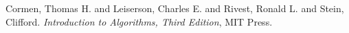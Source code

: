 \begin{thebibliography}{10}

 Cormen, Thomas H. and Leiserson, Charles E. and Rivest, Ronald L. and Stein, Clifford. \textit{Introduction to Algorithms, Third Edition}, MIT Press.  
\end{thebibliography}